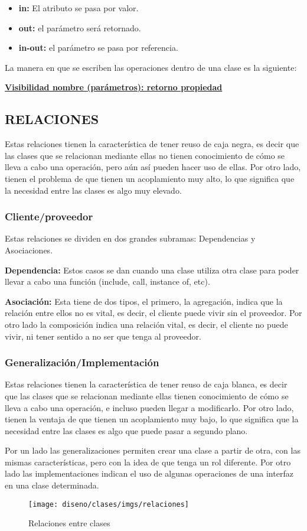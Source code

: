 \begin{itemize}
	\item{\textbf{in:} El atributo se pasa por valor.}
	\item{\textbf{out:} el parámetro será retornado.}
	\item{\textbf{in-out:} el parámetro se pasa por referencia. }
\end{itemize}

La manera en que se escriben las operaciones dentro de una clase es la siguiente:

\centerline{\textbf{\underline{Visibilidad nombre (parámetros): retorno {propiedad}}}}


\subsection{RELACIONES}
Estas relaciones tienen la característica de tener reuso de caja negra, es decir que las clases que se relacionan mediante ellas no tienen conocimiento de cómo se lleva a cabo una operación, pero aún así pueden hacer uso de ellas. Por otro lado, tienen el problema de que tienen un acoplamiento muy alto, lo que significa que la necesidad entre las clases es algo muy elevado.

\subsubsection{Cliente/proveedor}
Estas relaciones se dividen en dos grandes subramas: Dependencias y Asociaciones.

\textbf{Dependencia:}
Estos casos se dan cuando una clase utiliza otra clase para poder llevar a cabo una función (include, call, instance of, etc).

\textbf{Asociación:}
Esta tiene de dos tipos, el primero, la agregación, indica que la relación entre ellos no es vital, es decir, el cliente puede vivir sin el proveedor. Por otro lado la composición indica una relación vital, es decir, el cliente no puede vivir, ni tener sentido a no ser que tenga al proveedor.


\subsubsection{Generalización/Implementación}
Estas relaciones tienen la característica de tener reuso de caja blanca, es decir que las clases que se relacionan mediante ellas  tienen conocimiento de cómo se lleva a cabo una operación, e incluso pueden llegar a modificarlo. Por otro lado, tienen la ventaja de que tienen un acoplamiento muy bajo, lo que significa que la necesidad entre las clases es algo que puede pasar a segundo plano.

Por un lado las generalizaciones permiten crear una clase a partir de otra, con las mismas características, pero con la idea de que tenga un rol diferente. Por otro lado las implementaciones indican el uso de algunas operaciones de una interfaz en una clase determinada.

\begin{figure}[h!]
	\centering
	\texttt{[image: diseno/clases/imgs/relaciones]}
	\caption{Relaciones entre clases}
\end{figure}
